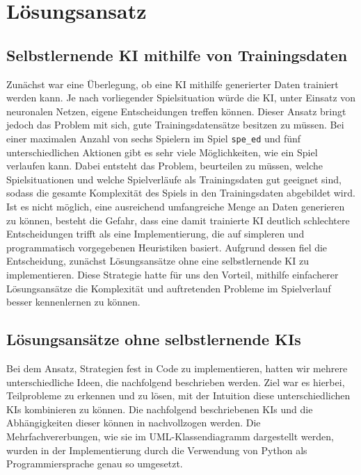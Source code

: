 \chapter{Lösungsansatz}
\label{ch:loesungsansatz}

\section{Selbstlernende KI mithilfe von Trainingsdaten}
\label{sec:selbstlernende-ki-trainingsdaten}

Zunächst war eine Überlegung, ob eine \ac{KI} mithilfe generierter Daten trainiert werden kann.
Je nach vorliegender Spielsituation würde die \ac{KI}, \bspw unter Einsatz von neuronalen Netzen, eigene Entscheidungen treffen können.
Dieser Ansatz bringt jedoch das Problem mit sich, gute Trainingsdatensätze besitzen zu müssen.
Bei einer maximalen Anzahl von sechs Spielern im Spiel \texttt{spe\_ed} und fünf unterschiedlichen Aktionen gibt
es sehr viele Möglichkeiten, wie ein Spiel verlaufen kann.
Dabei entsteht das Problem, beurteilen zu müssen, welche Spielsituationen und welche Spielverläufe als Trainingsdaten
gut geeignet sind, sodass die gesamte Komplexität des Spiels in den Trainingsdaten abgebildet wird.
Ist es nicht möglich, eine ausreichend umfangreiche Menge an Daten generieren zu können, besteht die Gefahr, dass eine
damit trainierte \ac{KI} deutlich schlechtere Entscheidungen trifft als eine Implementierung, die auf simpleren und
programmatisch vorgegebenen Heuristiken basiert.
Aufgrund dessen fiel die Entscheidung, zunächst Lösungsansätze ohne eine selbstlernende \ac{KI} zu implementieren.
Diese Strategie hatte für uns den Vorteil, mithilfe einfacherer Lösungsansätze die Komplexität und auftretenden Probleme
im Spielverlauf besser kennenlernen zu können.

\section{Lösungsansätze ohne selbstlernende KIs}
\label{sec:loesungsansatz-ohne-selbstlernende-kis}

Bei dem Ansatz, Strategien fest in Code zu implementieren, hatten wir mehrere unterschiedliche Ideen,
die nachfolgend beschrieben werden.
Ziel war es hierbei, Teilprobleme zu erkennen und zu lösen, mit der Intuition diese unterschiedlichen \ac{KI}s
kombinieren zu können.
Die nachfolgend beschriebenen \ac{KI}s und die Abhängigkeiten dieser können in 
nachvollzogen werden.
Die Mehrfachvererbungen, wie sie im UML-Klassendiagramm dargestellt werden, wurden in der Implementierung durch die
Verwendung von Python als Programmiersprache genau so umgesetzt.

